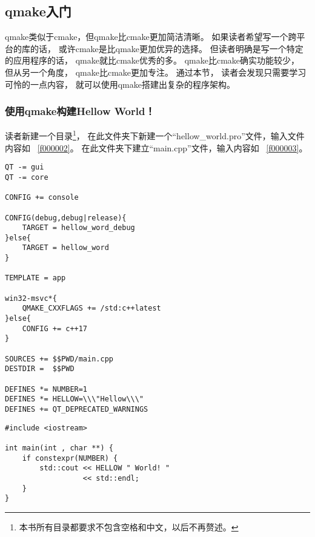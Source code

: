 ﻿%





%


\subsection{
qmake入门
}\label{s100310}


qmake类似于cmake，但qmake比cmake更加简洁清晰。
如果读者希望写一个跨平台的库的话，
或许cmake是比qmake更加优异的选择。
但读者明确是写一个特定的应用程序的话，
qmake就比cmake优秀的多。
qmake比cmake确实功能较少，
但从另一个角度，
qmake比cmake更加专注。
通过本节，
读者会发现只需要学习可怜的一点内容，
就可以使用qmake搭建出复杂的程序架构。



\subsubsection{
使用qmake构建Hellow World！
}\label{ss000610}

读者新建一个目录\footnote{
本书所有目录都要求不包含空格和中文，以后不再赘述。
}，
在此文件夹下新建一个“hellow\_world.pro”文件，输入文件内容如
\lstlistingname\ \ref{f000002}。
在此文件夹下建立“main.cpp”文件，输入内容如
\lstlistingname\ \ref{f000003}。

\begin{lstlisting}[label=f000002, 
caption=GoodLuck,
title=\lstlistingname\ \thelstlisting
]
QT -= gui
QT -= core

CONFIG += console

CONFIG(debug,debug|release){
    TARGET = hellow_word_debug
}else{
    TARGET = hellow_word
}

TEMPLATE = app

win32-msvc*{
    QMAKE_CXXFLAGS += /std:c++latest
}else{
    CONFIG += c++17
}

SOURCES += $$PWD/main.cpp
DESTDIR =  $$PWD

DEFINES *= NUMBER=1
DEFINES *= HELLOW=\\\"Hellow\\\"
DEFINES += QT_DEPRECATED_WARNINGS
\end{lstlisting}          %

\begin{lstlisting}[label=f000003, 
caption=GoodLuck,
title=\lstlistingname\ \thelstlisting
]
#include <iostream>

int main(int , char **) {
    if constexpr(NUMBER) {
        std::cout << HELLOW " World! "
                  << std::endl;
    }
}
\end{lstlisting}          %



